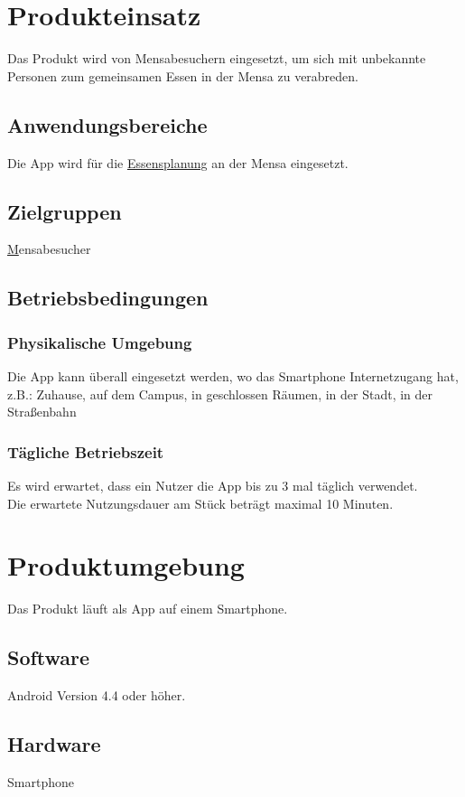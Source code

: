 \documentclass[a4paper]{scrreprt}
\begin{document}
\chapter{Produkteinsatz}
Das Produkt wird von Mensabesuchern eingesetzt, um sich mit unbekannte Personen zum gemeinsamen Essen in der Mensa zu verabreden.

 
\section{Anwendungsbereiche}
Die App wird für die \hyperlink{label3}{Essensplanung} an der Mensa eingesetzt.
 
\section{Zielgruppen}
\hyperlink{label1}Mensabesucher
 
\section{Betriebsbedingungen}
\subsection{Physikalische Umgebung}
Die App kann überall eingesetzt werden, wo das Smartphone Internetzugang hat,
z.B.: Zuhause, auf dem Campus, in geschlossen Räumen, in der Stadt, in der Straßenbahn

\subsection{Tägliche Betriebszeit}
Es wird erwartet, dass ein Nutzer die App bis zu 3 mal täglich verwendet. \\
Die erwartete Nutzungsdauer am Stück beträgt maximal 10 Minuten. 
 
\chapter{Produktumgebung}
Das Produkt läuft als App auf einem Smartphone.

\section{Software}
Android Version 4.4 oder höher.
 
\section{Hardware}
Smartphone 
 
\end{document}
